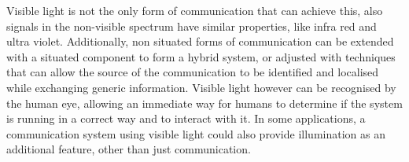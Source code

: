 Visible light is not the only form of communication that can achieve this, also signals in the non-visible spectrum have similar properties, like infra red and ultra violet.
Additionally, non situated forms of communication can be extended with a situated component to form a hybrid system, or adjusted with techniques that can allow the source of the communication to be identified and localised while exchanging generic information.
Visible light however can be recognised by the human eye, allowing an immediate way for humans to determine if the system is running in a correct way and to interact with it.
In some applications, a communication system using visible light could also provide illumination as an additional feature, other than just communication.

